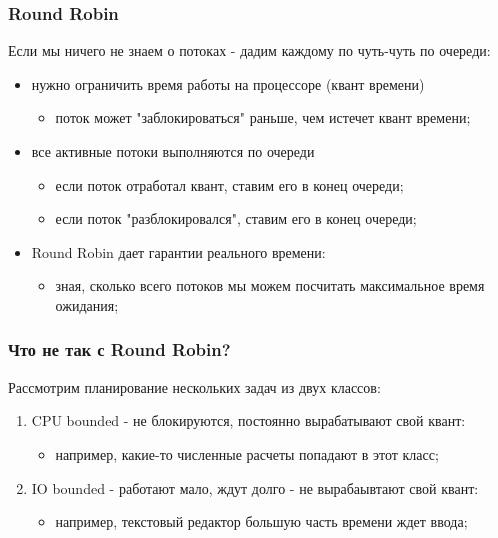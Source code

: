\begin{frame}
\frametitle{Round Robin}

Если мы ничего не знаем о потоках - дадим каждому по чуть-чуть по очереди:
\begin{itemize}
  \item<2-> нужно ограничить время работы на процессоре (квант времени)
        \begin{itemize}
          \item поток может "заблокироваться" раньше, чем истечет квант времени;
        \end{itemize}
  \item<3-> все активные потоки выполняются по очереди
        \begin{itemize}
          \item если поток отработал квант, ставим его в конец очереди;
          \item если поток "разблокировался", ставим его в конец очереди;
        \end{itemize}
  \item<4-> Round Robin дает гарантии реального времени:
        \begin{itemize}
          \item зная, сколько всего потоков мы можем посчитать максимальное
                время ожидания;
        \end{itemize}
\end{itemize}
\end{frame}

\begin{frame}
\frametitle{Что не так с Round Robin?}

Рассмотрим планирование нескольких задач из двух классов:
\begin{enumerate}
  \item<2-> CPU bounded - не блокируются, постоянно вырабатывают свой квант:
        \begin{itemize}
          \item например, какие-то численные расчеты попадают в этот класс;
        \end{itemize}
  \item<3-> IO bounded - работают мало, ждут долго - не вырабаывтают свой квант:
        \begin{itemize}
          \item например, текстовый редактор большую часть времени ждет ввода;
        \end{itemize}
\end{enumerate}
\end{frame}

